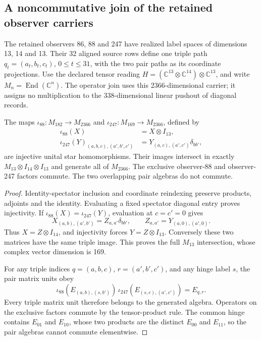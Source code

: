 \subsection{A noncommutative join of the retained observer carriers}
\label{sec:triple-carrier-operator-join}

The retained observers 86, 88 and 247 have realized label spaces of
dimensions 13, 14 and 13. Their 32 aligned source rows define one triple
path \(q_t=(a_t,b_t,c_t)\), \(0\leq t\leq31\), with the two pair paths
as its coordinate projections. Use the declared tensor reading
\(H=(\mathbb C^{13}\otimes\mathbb C^{14})\otimes\mathbb C^{13}\),
and write \(M_n=\operatorname{End}(\mathbb C^n)\). The operator join
uses this 2366-dimensional carrier; it assigns no multiplication to the
338-dimensional linear pushout of diagonal records.

\begin{theorem}
The maps \(\iota_{88}:M_{182}\to M_{2366}\) and
\(\iota_{247}:M_{169}\to M_{2366}\), defined by
\begin{align}
 \iota_{88}(X)&=X\otimes I_{13},\label{eq:triple-operator-88}\\
 \iota_{247}(Y)_{(a,b,c),(a',b',c')}
   &=Y_{(a,c),(a',c')}\delta_{bb'},\label{eq:triple-operator-247}
\end{align}
are injective unital star homomorphisms. Their images intersect in exactly
\(M_{13}\otimes I_{14}\otimes I_{13}\) and generate all of \(M_{2366}\).
The exclusive observer-88 and observer-247 factors commute. The two
overlapping pair algebras do not commute.
\end{theorem}
\begin{proof}
Identity-spectator inclusion and coordinate reindexing preserve products,
adjoints and the identity. Evaluating a fixed spectator diagonal entry proves
injectivity. If \(\iota_{88}(X)=\iota_{247}(Y)\), evaluation at
\(c=c'=0\) gives
\[
 X_{(a,b),(a',b')}=Z_{a,a'}\delta_{bb'},
 \qquad Z_{a,a'}=Y_{(a,0),(a',0)}.
\]
Thus \(X=Z\otimes I_{14}\), and injectivity forces
\(Y=Z\otimes I_{13}\). Conversely these two matrices have the same
triple image. This proves the full \(M_{13}\) intersection, whose complex
vector dimension is 169.

For any triple indices \(q=(a,b,c)\), \(r=(a',b',c')\), and any hinge
label \(s\), the pair matrix units obey
\[
 \iota_{88}(E_{(a,b),(s,b')})\,
 \iota_{247}(E_{(s,c),(a',c')})=E_{q,r}.
\]
Every triple matrix unit therefore belongs to the generated algebra.
Operators on the exclusive factors commute by the tensor-product rule.
The common hinge contains \(E_{01}\) and \(E_{10}\), whose two products
are the distinct \(E_{00}\) and \(E_{11}\), so the pair algebras cannot
commute elementwise.
\end{proof}

